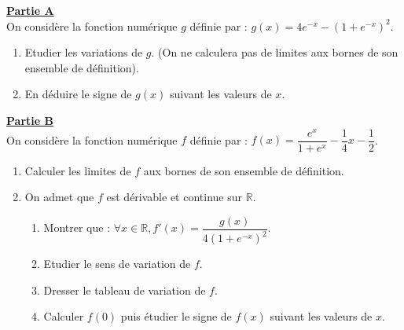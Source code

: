 \documentclass[12pt,a4paper]{article}
\begin{document}
\vspace{0.3cm}

\noindent \underline{\textbf{Partie A}} \\
On considère la fonction numérique $g$ définie par : $g(x) = 4e^{-x} - (1 + e^{-x})^2$.
\begin{enumerate}
    \item Etudier les variations de $g$. (On ne calculera pas de limites aux bornes de son ensemble de définition).
    \item En déduire le signe de $g(x)$ suivant les valeurs de $x$.
\end{enumerate}

\vspace{0.5cm}

\noindent \underline{\textbf{Partie B}} \\
On considère la fonction numérique $f$ définie par : $f(x) = \dfrac{e^x}{1+e^x} - \dfrac{1}{4}x - \dfrac{1}{2}$.
\begin{enumerate}
    \item Calculer les limites de $f$ aux bornes de son ensemble de définition.
    \item On admet que $f$ est dérivable et continue sur $\mathbb{R}$.
    \begin{enumerate}
        \item Montrer que : $\forall x \in \mathbb{R}, f'(x) = \dfrac{g(x)}{4(1+e^{-x})^2}$.
        \item Etudier le sens de variation de $f$.
        \item Dresser le tableau de variation de $f$.
        \item Calculer $f(0)$ puis étudier le signe de $f(x)$ suivant les valeurs de $x$.
    \end{enumerate}
\end{enumerate}

\vspace{0.5cm}
\end{document}
